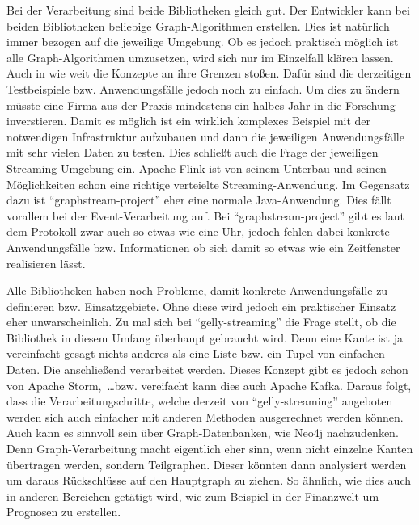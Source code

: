 Bei der Verarbeitung sind beide Bibliotheken gleich gut. Der Entwickler kann bei
beiden Bibliotheken beliebige Graph-Algorithmen erstellen. Dies ist natürlich
immer bezogen auf die jeweilige Umgebung. Ob es jedoch praktisch möglich ist
alle Graph-Algorithmen umzusetzen, wird sich nur im Einzelfall klären lassen.
Auch in wie weit die Konzepte an ihre Grenzen stoßen. Dafür sind die derzeitigen
Testbeispiele bzw. Anwendungsfälle jedoch noch zu einfach. Um dies zu ändern
müsste eine Firma aus der Praxis mindestens ein halbes Jahr in die Forschung
inverstieren. Damit es möglich ist ein wirklich komplexes Beispiel mit der
notwendigen Infrastruktur aufzubauen und dann die jeweiligen Anwendungsfälle
mit sehr vielen Daten zu testen. Dies schließt auch die Frage der jeweiligen
Streaming-Umgebung ein. Apache Flink ist von seinem Unterbau und seinen
Möglichkeiten schon eine richtige verteielte Streaming-Anwendung. Im Gegensatz
dazu ist \enquote{graphstream-project} eher eine normale Java-Anwendung. Dies
fällt vorallem bei der Event-Verarbeitung auf. Bei \enquote{graphstream-project}
gibt es laut dem Protokoll zwar auch so etwas wie eine Uhr, jedoch fehlen dabei
konkrete Anwendungsfälle bzw. Informationen ob sich damit so etwas wie ein
Zeitfenster realisieren lässt.

Alle Bibliotheken haben noch Probleme, damit konkrete Anwendungsfälle zu
definieren bzw. Einsatzgebiete. Ohne diese wird jedoch ein praktischer Einsatz
eher unwarscheinlich. Zu mal sich bei \enquote{gelly-streaming} die Frage stellt,
ob die Bibliothek in diesem Umfang überhaupt gebraucht wird. Denn eine Kante
ist ja vereinfacht gesagt nichts anderes als eine Liste bzw. ein Tupel von
einfachen Daten. Die anschließend verarbeitet werden. Dieses Konzept gibt es
jedoch schon von Apache Storm,~\dots bzw. vereifacht kann dies auch Apache Kafka.
Daraus folgt, dass die Verarbeitungschritte, welche derzeit von
\enquote{gelly-streaming} angeboten werden sich auch einfacher mit anderen
Methoden ausgerechnet werden können. Auch kann es sinnvoll sein über
Graph-Datenbanken, wie Neo4j nachzudenken. Denn Graph-Verarbeitung macht
eigentlich eher sinn, wenn nicht einzelne Kanten übertragen werden, sondern
Teilgraphen. Dieser könnten dann analysiert werden um daraus Rückschlüsse auf
den Hauptgraph zu ziehen. So ähnlich, wie dies auch in anderen Bereichen
getätigt wird, wie zum Beispiel in der Finanzwelt um Prognosen zu erstellen.
